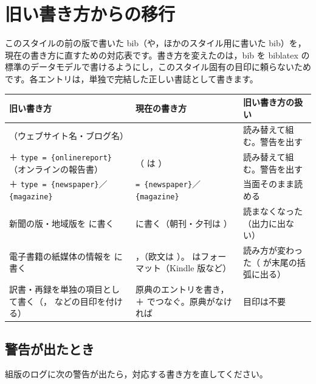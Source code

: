 \section{旧い書き方からの移行}\label{sec:migrate}
このスタイルの前の版で書いた bib（や，ほかのスタイル用に書いた bib）を，現在の書き方に直すための対応表です。書き方を変えたのは，bib を biblatex の標準のデータモデルで書けるようにし，このスタイル固有の目印に頼らないためです。各エントリは，単独で完結した正しい書誌として書きます。

\begin{center}\small
\begin{tabular}{@{}L{.25\textwidth}L{.30\textwidth}L{.30\textwidth}@{}}
\toprule
\textbf{旧い書き方} & \textbf{現在の書き方} & \textbf{旧い書き方の扱い} \\
\midrule
{}（ウェブサイト名・ブログ名） &  & 読み替えて組む。警告を出す \\
 ＋ \texttt{type = \{onlinereport\}}（オンラインの報告書） & （ は ） & 読み替えて組む。警告を出す \\
 ＋ \texttt{type = \{newspaper\}}／\texttt{\{magazine\}} &  \texttt{= \{newspaper\}}／\texttt{\{magazine\}} & 当面そのまま読める \\
新聞の版・地域版を  に書く &  に書く（朝刊・夕刊は ） & 読まなくなった（出力に出ない） \\
電子書籍の紙媒体の情報を  に書く & ，（欧文は ）。 はフォーマット（Kindle 版など） & 読み方が変わった（ が末尾の括弧に出る） \\
訳書・再録を単独の項目として書く（， などの目印を付ける） & 原典のエントリを書き， ＋  でつなぐ。原典がなければ  & 目印は不要 \\
\bottomrule
\end{tabular}
\end{center}

\subsection{警告が出たとき}
組版のログに次の警告が出たら，対応する書き方を直してください。

